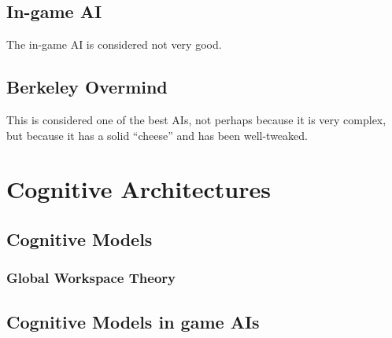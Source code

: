\subsection{In-game AI}
The in-game AI is considered not very good.

\subsection{Berkeley Overmind}
This is considered one of the best AIs, not perhaps because it is very complex,
but because it has a solid ``cheese'' and has been well-tweaked.


\section{Cognitive Architectures}
\subsection{Cognitive Models}
\subsubsection{Global Workspace Theory}
\subsection{Cognitive Models in game AIs}